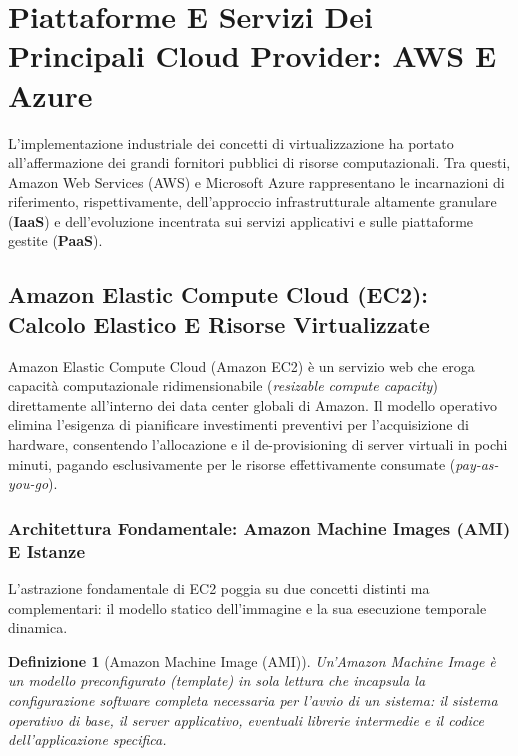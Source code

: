 \documentclass[11pt, a4paper]{article}
\newtheorem{theorem}{Definizione}
\begin{document}
\newpage

\section{Piattaforme E Servizi Dei Principali Cloud Provider: AWS E Azure}

L'implementazione industriale dei concetti di virtualizzazione ha portato all'affermazione dei grandi fornitori pubblici di risorse computazionali. Tra questi, Amazon Web Services (AWS) e Microsoft Azure rappresentano le incarnazioni di riferimento, rispettivamente, dell'approccio infrastrutturale altamente granulare (\textbf{IaaS}) e dell'evoluzione incentrata sui servizi applicativi e sulle piattaforme gestite (\textbf{PaaS}).


\subsection{Amazon Elastic Compute Cloud (EC2): Calcolo Elastico E Risorse Virtualizzate}

Amazon Elastic Compute Cloud (Amazon EC2) è un servizio web che eroga capacità computazionale ridimensionabile (\emph{resizable compute capacity}) direttamente all'interno dei data center globali di Amazon. Il modello operativo elimina l'esigenza di pianificare investimenti preventivi per l'acquisizione di hardware, consentendo l'allocazione e il de-provisioning di server virtuali in pochi minuti, pagando esclusivamente per le risorse effettivamente consumate (\emph{pay-as-you-go}).

\subsubsection{Architettura Fondamentale: Amazon Machine Images (AMI) E Istanze}
L'astrazione fondamentale di EC2 poggia su due concetti distinti ma complementari: il modello statico dell'immagine e la sua esecuzione temporale dinamica.

\begin{theorem}[Amazon Machine Image (AMI)]
Un'Amazon Machine Image è un modello preconfigurato (\emph{template}) in sola lettura che incapsula la configurazione software completa necessaria per l'avvio di un sistema: il sistema operativo di base, il server applicativo, eventuali librerie intermedie e il codice dell'applicazione specifica.
\end{theorem}
\end{document}
